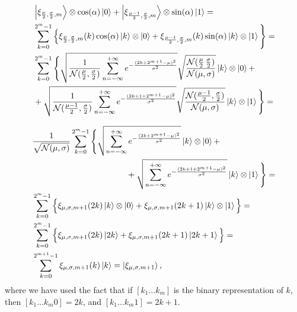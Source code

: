 \documentclass[a4paper,10pt]{report}
\begin{document}
\begin{align}
&\ket{\xi_{\frac{\mu}{2},\frac{\sigma}{2},m}}\otimes\cos(\alpha)\ket{0} + \ket{\xi_{\frac{\mu-1}{2},\frac{\sigma}{2},m}}\otimes\sin(\alpha)\ket{1} = \nonumber\\
&\sum_{k=0}^{2^m-1}\Big\{\xi_{\frac{\mu}{2},\frac{\sigma}{2},m}(k)\cos(\alpha)\ket{k}\otimes\ket{0} + \xi_{\frac{\mu-1}{2},\frac{\sigma}{2},m}(k)\sin(\alpha)\ket{k}\otimes\ket{1}\Bigg\} = \nonumber\\
&\sum_{k=0}^{2^m-1}\Bigg\{\sqrt{\frac{1}{\mathcal{N}(\frac{\mu}{2},\frac{\sigma}{2})}\sum_{n=-\infty}^{+\infty}e^{-\frac{(2k+2^{m+1}-\mu)^2}{\sigma^2}}} \sqrt{\frac{\mathcal{N}(\frac{\mu}{2}\,\frac{\sigma}{2})}{\mathcal{N}(\mu,\sigma)}}\ket{k}\otimes\ket{0} + \nonumber\\ 
&+ \sqrt{\frac{1}{\mathcal{N}(\frac{\mu-1}{2},\frac{\sigma}{2})}\sum_{n=-\infty}^{+\infty}e^{-\frac{(2k+1+2^{m+1}-\mu)^2}{\sigma^2}}}\sqrt{\frac{\mathcal{N}(\frac{\mu-1}{2},\frac{\sigma}{2})}{\mathcal{N}(\mu,\sigma)}}\ket{k}\otimes\ket{1}\Bigg\} = \nonumber
\end{align}

\begin{align}
&\frac{1}{\sqrt{\mathcal{N}(\mu,\sigma)}}\sum_{k=0}^{2^m-1}\Bigg\{\sqrt{\sum_{n=-\infty}^{+\infty}e^{-\frac{(2k+2^{m+1}-\mu)^2}{\sigma^2}}}\ket{k}\otimes\ket{0} + \nonumber\\ 
&\hspace{4cm}+ \sqrt{\sum_{n=-\infty}^{+\infty}e^{-\frac{(2k+1+2^{m+1}-\mu)^2}{\sigma^2}}}\ket{k}\otimes\ket{1}\Bigg\} = \nonumber\\
&\sum_{k=0}^{2^m-1}\Big\{\xi_{\mu,\sigma,m+1}(2k)\ket{k}\otimes\ket{0} + \xi_{\mu,\sigma,m+1}(2k+1)\ket{k}\otimes\ket{1}\Big\} = \nonumber\\
&\sum_{k=0}^{2^m-1}\Big\{\xi_{\mu,\sigma,m+1}(2k)\ket{2k} + \xi_{\mu,\sigma,m+1}(2k+1)\ket{2k+1}\Big\} = \nonumber\\
&\sum_{k=0}^{2^{m+1}-1}\xi_{\mu,\sigma,m+1}(k)\ket{k} = \ket{\xi_{\mu,\sigma,m+1}}, 
\end{align}
where we have used the fact that if $[k_1\dots k_m]$ is the binary representation of $k$, then $[k_1\dots k_m0] = 2k$, and $[k_1\dots k_m1] = 2k+1$. 
\end{document}
